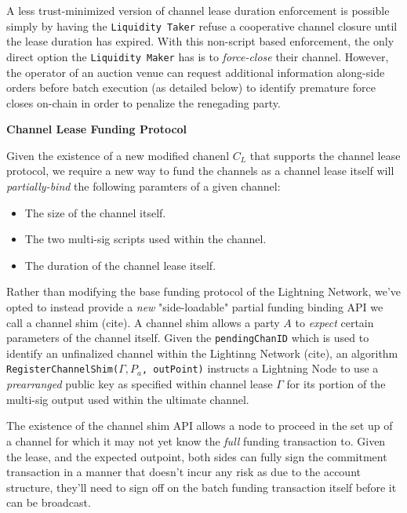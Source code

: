 \documentclass[10pt,a4paper]{article}
\theoremstyle{definition}
\begin{document}
A less trust-minimized version of channel lease duration enforcement is
possible simply by having the \texttt{Liquidity Taker} refuse a cooperative
channel closure until the lease duration has expired. With this non-script
based enforcement, the only direct option the \texttt{Liquidity Maker} has is
to \emph{force-close} their channel. However, the operator of an auction venue
can request additional information along-side orders before batch execution (as
detailed below) to identify premature force closes on-chain in order to
penalize the renegading party.


\begin{center}
    \textbf{Channel Lease Funding Protocol}
\end{center}

Given the existence of a new modified chanenl $C_{L}$ that supports the channel
lease protocol, we require a new way to fund the channels as a channel
lease itself will \emph{partially-bind} the following paramters of a given
channel:
\begin{itemize}
    \item The size of the channel itself.
    \item The two multi-sig scripts used within the channel.
    \item The duration of the channel lease itself.
\end{itemize}

Rather than modifying the base funding protocol of the Lightning Network, we've
opted to instead provide a \emph{new} "side-loadable" partial funding binding
API we call a channel shim (cite). A channel shim allows a party $A$ to
\emph{expect} certain parameters of the channel itself. Given the
\texttt{pendingChanID} which is used to identify an unfinalized channel within
the Lightinng Network (cite), an algorithm \texttt{RegisterChannelShim($\Gamma,
P_{a}$, outPoint)} instructs a Lightning Node to use a \emph{prearranged} public key as
specified within channel lease $\Gamma$ for its portion of the multi-sig output
used within the ultimate channel.

The existence of the channel shim API allows a node to proceed in the set up of
a channel for which it may not yet know the \emph{full} funding transaction to.
Given the lease, and the expected outpoint, both sides can fully sign the
commitment transaction in a manner that doesn't incur any risk as due to the
account structure, they'll need to sign off on the batch funding transaction
itself before it can be broadcast.
\end{document}
